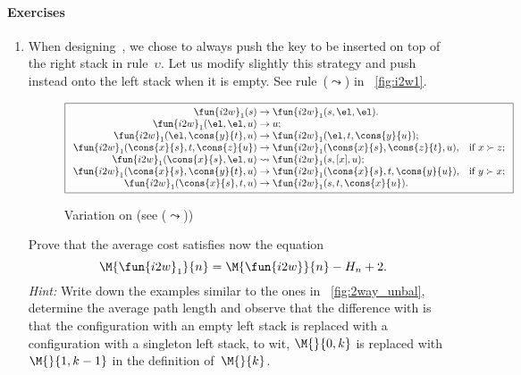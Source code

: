 \paragraph{Exercises}
\begin{enumerate}

  \item When designing~, we chose to
    always push the key to be inserted on top of the right stack in
    rule~\(\upsilon\). Let us modify slightly this strategy and push
    instead onto the left stack when it is empty. See
    rule~(\(\leadsto\)) in \fig~\vref{fig:i2w1}.
    \begin{figure}[b]
    \begin{equation*}
      \boxed{%
      \begin{array}{r@{\;}l@{\;}ll}
        \fun{i2w}_1(s) & \rightarrow
                      & \fun{i2w}_1(s,\el,\el).\\
        \fun{i2w}_1(\el,\el,u) & \rightarrow & u;\\
        \fun{i2w}_1(\el,\cons{y}{t},u)
                     & \rightarrow
                     & \fun{i2w}_1(\el,t,\cons{y}{u});\\
        \fun{i2w}_1(\cons{x}{s},t,\cons{z}{u})
                     & \rightarrow
                     & \fun{i2w}_1(\cons{x}{s},\cons{z}{t},u),
                     & \text{if \(x \succ z\)};\\
        \fun{i2w}_1(\cons{x}{s},\el,u)
                     & \leadsto
                     & \fun{i2w}_1(s,[x],u);\\
        \fun{i2w}_1(\cons{x}{s},\cons{y}{t},u)
                     & \rightarrow
                     & \fun{i2w}_1(\cons{x}{s},t,\cons{y}{u}),
                     & \text{if \(y \succ x\)};\\
        \fun{i2w}_1(\cons{x}{s},t,u)
                     & \rightarrow
                     & \fun{i2w}_1(s,t,\cons{x}{u}).
      \end{array}}
    \end{equation*}
    \caption{Variation  on  (see
      (\(\leadsto\)))}
    \label{fig:i2w1}
    \end{figure}
    Prove that the average cost satisfies now the equation
     
    \begin{equation*}
      \M{\fun{i2w}_1}{n} = \M{\fun{i2w}}{n} - H_n + 2.
    \end{equation*}
    \emph{Hint:} Write down the examples similar to the ones in
    \fig~\vref{fig:2way_unbal}, determine the average path length and
    observe that the difference with
     is that the configuration with
    an empty left stack is replaced with a configuration with a
    singleton left stack, to wit, \(\M{}{0,k}\) is replaced
    with~\(\M{}{1,k-1}\) in the definition of~\(\M{}{k}\).


\end{enumerate}
